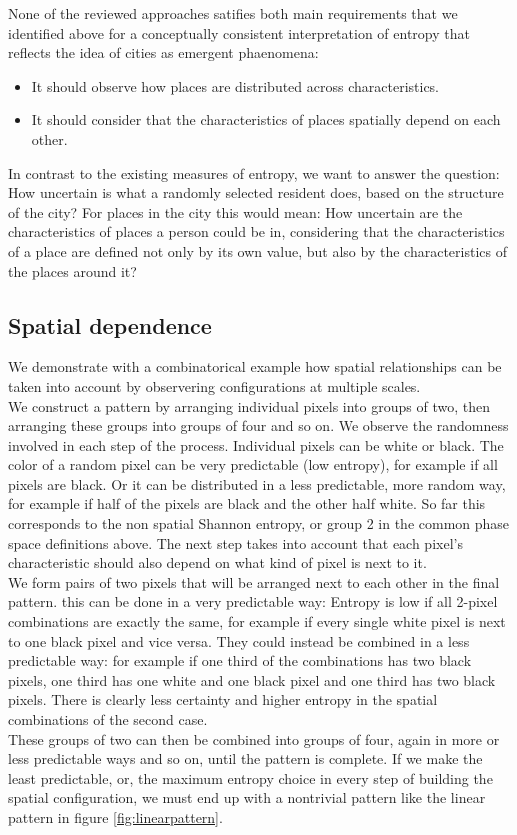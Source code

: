 \documentclass[fleqn,10pt]{wlscirep}
\begin{document}
None of the reviewed approaches satifies both main requirements that we identified above for a conceptually consistent interpretation of entropy that reflects the idea of cities as emergent phaenomena:
\begin{itemize}
\item{It should observe how places are distributed across characteristics.}
\item{It should consider that the characteristics of places spatially depend on each other.}
\end{itemize}
In contrast to the existing measures of entropy, we want to answer the question: How uncertain is what a randomly selected resident does, based on the structure of the city? For places in the city this would mean: How uncertain are the characteristics of places a person could be in, considering that the characteristics of a place are defined not only by its own value, but also by the characteristics of the places around it?

\subsection*{Spatial dependence}
We demonstrate with a combinatorical example how spatial relationships can be taken into account by observering configurations at multiple scales.
\\We construct a pattern by arranging individual pixels into groups of two, then arranging these groups into groups of four and so on. We observe the randomness involved in each step of the process.\newline
Individual pixels can be white or black. The color of a random pixel can be very predictable (low entropy), for example if all pixels are black. Or it can be distributed in a less predictable, more random way, for example if half of the pixels are black and the other half white. So far this corresponds to the non spatial Shannon entropy, or group 2 in the common phase space definitions above.\newline
The next step takes into account that each pixel's characteristic should also depend on what kind of pixel is next to it.
\\We form pairs of two pixels that will be arranged next to each other in the final pattern. this can be done in a very predictable way: Entropy is low if all 2-pixel combinations are exactly the same, for example if every single white pixel is next to one black pixel and vice versa. They could instead be combined in a less predictable way: for example if one third of the combinations has two black pixels, one third has one white and one black pixel and one third has two black pixels. There is clearly less certainty and higher entropy in the spatial combinations of the second case.
\\These groups of two can then be combined into groups of four, again in more or less predictable ways and so on, until the pattern is complete.
If we make the least predictable, or, the maximum entropy choice in every step of building the spatial configuration, we must end up with a nontrivial pattern like the linear pattern in figure \ref{fig:linearpattern}.
\end{document}
